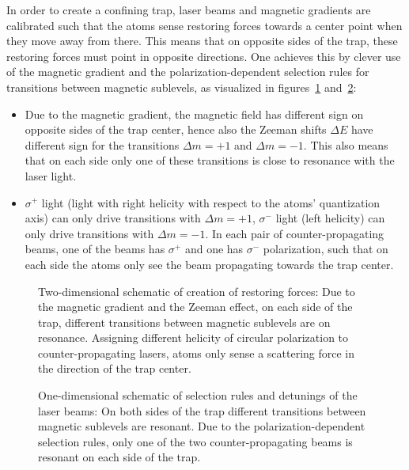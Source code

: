 In order to create a confining trap, laser beams and magnetic gradients are calibrated such that the atoms sense restoring forces towards a center point when they move away from there. This means that on opposite sides of the trap, these restoring forces must point in opposite directions. One achieves this by clever use of the magnetic gradient and the polarization-dependent selection rules for transitions between magnetic sublevels, as visualized in figures~\ref{fig:restoring_on_opposite_sides_schematic} and~\ref{fig:detuning_and_selection_rules_schematic}:
\begin{itemize}
    \item Due to the magnetic gradient, the magnetic field has different sign on opposite sides of the trap center, hence also the Zeeman shifts $\Delta E$ have different sign for the transitions $\Delta m = +1$ and $\Delta m = -1$. This also means that on each side only one of these transitions is close to resonance with the laser light.
    \item $\sigma^+$ light (light with right helicity with respect to the atoms' quantization axis) can only drive transitions with $\Delta m = +1$, $\sigma^-$ light (left helicity) can only drive transitions with $\Delta m = -1$. In each pair of counter-propagating beams, one of the beams has $\sigma^+$ and one has $\sigma^-$ polarization, such that on each side the atoms only see the beam propagating towards the trap center.
\end{itemize}

\begin{figure}
    \caption{Two-dimensional schematic of creation of restoring forces: Due to the magnetic gradient and the Zeeman effect, on each side of the trap, different transitions between magnetic sublevels are on resonance. Assigning different helicity of circular polarization to counter-propagating lasers, atoms only sense a scattering force in the direction of the trap center.}\label{fig:restoring_on_opposite_sides_schematic}
\end{figure} 

\begin{figure}
    \caption{One-dimensional schematic of selection rules and detunings of the laser beams: On both sides of the trap different transitions between magnetic sublevels are resonant. Due to the polarization-dependent selection rules, only one of the two counter-propagating beams is resonant on each side of the trap.}\label{fig:detuning_and_selection_rules_schematic}
\end{figure}


